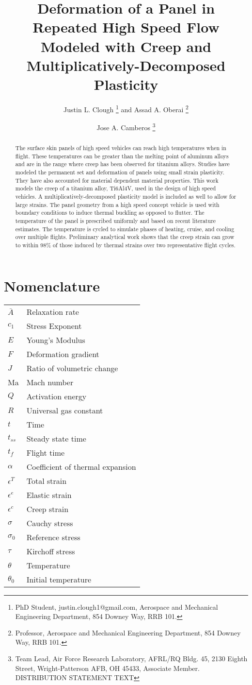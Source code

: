 \documentclass[conf]{new-aiaa}
\title{ Deformation of a Panel in Repeated High Speed Flow 
        Modeled with Creep and Multiplicatively-Decomposed Plasticity}
\author{Justin L. Clough%
        \footnote{
          PhD Student, 
          justin.clough1@gmail.com,
          Aerospace and Mechanical Engineering Department, 
          854 Downey Way, RRB 101.}
        and Assad A. Oberai%
        \footnote{  
          Professor, 
          Aerospace and Mechanical Engineering Department, 
          854 Downey Way, RRB 101.}}
\affil{University of Southern California,
       Los Angeles, CA, 90089}
\author{Jose A. Camberos%
        \footnote{
          Team Lead, %
          Air Force Research Laboratory, AFRL/RQ
          Bldg. 45, 2130 Eighth Street,
          Wright-Patterson AFB, OH 45433,
          Associate Member.
          \newline
          \newline
          DISTRIBUTION STATEMENT TEXT}} %
\affil{AFRL/RQHV, Wright-Patterson AFB,
       Dayton, OH, 45433}
\begin{document}
\maketitle

\begin{abstract}
The surface skin panels of high speed vehicles can reach high 
temperatures when in flight. 
These temperatures can be greater than the melting point
of aluminum alloys and are in the range where
creep has been observed for titanium alloys.
Studies have modeled the permanent set and deformation 
of panels using small strain plasticity.
They have also accounted for material 
dependent material properties.
This work models the creep of a titanium alloy, Ti6Al4V,
used in the design of high speed vehicles.
A multiplicatively-decomposed plasticity model
is included as well to allow for large strains.
The panel geometry from a high speed concept vehicle is
used with boundary conditions to induce thermal buckling
as opposed to flutter.
The temperature of the panel is prescribed uniformly 
and based on recent literature estimates.
The temperature is cycled to simulate phases of
heating, cruise, and cooling over multiple flights.
Preliminary analytical work shows that the creep strain can 
grow to within 98\% of those induced by thermal strains 
over two representative flight cycles.
\end{abstract}

\section{Nomenclature}

{\renewcommand\arraystretch{1.0}
\noindent\begin{longtable*}{@{}l @{\quad=\quad} l@{}}
$\bar{A}$    & Relaxation rate\\
$c_1$        & Stress Exponent\\
$E$          & Young's Modulus \\
$F$          & Deformation gradient\\
$J$          & Ratio of volumetric change\\
Ma           & Mach number\\
$Q$          & Activation energy\\
$R$          & Universal gas constant\\
$t$          & Time\\
$t_{ss}$     & Steady state time\\
$t_{f}$      & Flight time \\
$\alpha$     & Coefficient of thermal expansion\\
$\epsilon^T$ & Total strain\\
$\epsilon^e$ & Elastic strain\\
$\epsilon^c$ & Creep strain\\
$\sigma$     & Cauchy stress\\
$\sigma_0$   & Reference stress\\
$\tau$       & Kirchoff stress\\
$\theta$     & Temperature\\
$\theta_0$   & Initial temperature
\end{longtable*}}
\end{document}

